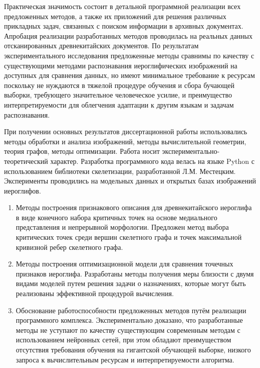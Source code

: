 Практическая значимость состоит в детальной программной реализации всех предложенных методов, а также их приложений для решения различных прикладных задач, связанных с поиском информации в архивных документах. Апробация реализации разработанных методов проводилась на реальных данных отсканированных древнекитайских документов. По результатам экспериментального исследования предложенные методы сравнимы по качеству с существующими методами распознавания иероглифических изображений на доступных для сравнения данных, но имеют минимальное требование к ресурсам поскольку не нуждаются в тяжелой процедуре обучения и сбора бучающей выборки, требующего значительное человеческое усилие, и преимущество интерпретируемости для облегчения адаптации к другим языкам и задачам распознавания.

{\methods} При получении основных результатов диссертационной работы использовались методы обработки и анализа изображений, методы вычислительной геометрии, теория графов, методы оптимизации. Работа носит экспериментально-теоретический характер. Разработка программного кода велась на языке Python с использованием библиотеки скелетизации, разработанной Л.М.
Местецким. Эксперименты проводились на модельных данных и открытых
базах изображений иероглифов.

{}
\begin{enumerate}[beginpenalty=10000] %
    \item Методы построения признакового описания для древнекитайского иероглифа в виде конечного набора критичных точек на основе медиального представления и непрерывной морфологии. Предложен метод выбора критических точек среди вершин скелетного графа и точек максимальной кривизной ребер скелетного графа.
    \item Методы построения оптимизационной модели для сравнения точечных признаков иероглифа. Разработаны методы получения меры близости с двумя видами моделей путем решения задачи о назначениях, которые могут быть реализованы эффективной процедурой вычисления.
    \item Обоснование работоспособности предложенных методов путём реализации программного комплекса. Экспериментально доказано, что разработанные методы не уступают по качеству существующим современным методам с использованием нейронных сетей, при этом обладают преимуществом отсутствия требования обучения на гигантской обучающей выборке, низкого запроса к вычислительным ресурсам и интерпретируемости алгоритма.
\end{enumerate}

